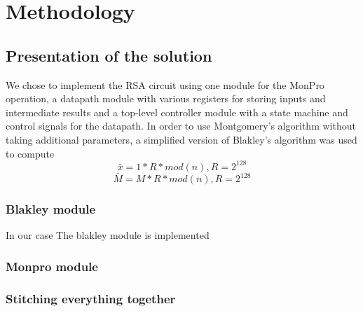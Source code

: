 \chapter{Methodology}
\section{Presentation of the solution}
We chose to implement the RSA circuit using one module for the MonPro operation, a datapath module with various registers for storing inputs and intermediate results and a top-level controller module with a state machine and control signals for the datapath.
In order to use Montgomery's algorithm without taking additional parameters, a simplified version of Blakley's algorithm was used to compute
\begin{equation}
    \bar{x}=1*R*mod(n), R=2^{128}
\end{equation}
\begin{equation}
    \bar{M}=M*R*mod(n), R=2^{128}
\end{equation}


\subsection{Blakley module}
In our case
The blakley module is implemented 

\subsection{Monpro module}


\subsection{Stitching everything together}

